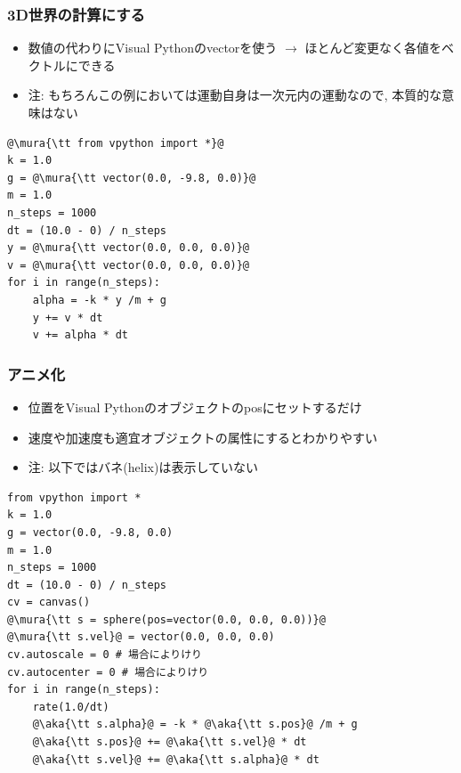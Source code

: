 \documentclass[10pt,dvipdfmx]{beamer}
\newcommand{\mura}[1]{{\color{purple}#1}}
\newcommand{\aka}[1]{{\color{red}#1}}
\begin{document}
\begin{frame}[fragile]
\frametitle{3D世界の計算にする}
\begin{itemize}
\item 数値の代わりに\aka{Visual Pythonのvectorを使う} $\rightarrow$
  ほとんど変更なく各値をベクトルにできる
\item 注: もちろんこの例においては運動自身は一次元内の運動なので,
  本質的な意味はない
\end{itemize}

\begin{lstlisting}
@\mura{\tt from vpython import *}@
k = 1.0
g = @\mura{\tt vector(0.0, -9.8, 0.0)}@
m = 1.0
n_steps = 1000
dt = (10.0 - 0) / n_steps 
y = @\mura{\tt vector(0.0, 0.0, 0.0)}@
v = @\mura{\tt vector(0.0, 0.0, 0.0)}@
for i in range(n_steps):
    alpha = -k * y /m + g
    y += v * dt
    v += alpha * dt
\end{lstlisting}
\end{frame}



\begin{frame}[fragile]
\frametitle{アニメ化}
\begin{itemize}
\item 位置をVisual Pythonのオブジェクトのposにセットするだけ
\item 速度や加速度も適宜オブジェクトの属性にするとわかりやすい
\item 注: 以下ではバネ(helix)は表示していない
\end{itemize}

\begin{lstlisting}
from vpython import *
k = 1.0
g = vector(0.0, -9.8, 0.0)
m = 1.0
n_steps = 1000
dt = (10.0 - 0) / n_steps
cv = canvas()
@\mura{\tt s = sphere(pos=vector(0.0, 0.0, 0.0))}@
@\mura{\tt s.vel}@ = vector(0.0, 0.0, 0.0)
cv.autoscale = 0 # 場合によりけり
cv.autocenter = 0 # 場合によりけり
for i in range(n_steps):
    rate(1.0/dt)
    @\aka{\tt s.alpha}@ = -k * @\aka{\tt s.pos}@ /m + g
    @\aka{\tt s.pos}@ += @\aka{\tt s.vel}@ * dt
    @\aka{\tt s.vel}@ += @\aka{\tt s.alpha}@ * dt
\end{lstlisting}
\end{frame}

\end{document}
